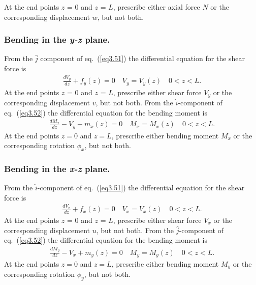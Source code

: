 \documentclass{AeroStructure-ERJohnson}
\begin{document}
\vspace*{-10pt}\pagebreak

\noindent At the end points $z$ = 0 and $z$ = $L$, prescribe either axial force $N$ or the corresponding displacement $w$, but not both.

\subsubsection{Bending in the \textit{y-z} plane.} From the $\hat{j}$ component of eq.~(\ref{eq3.51}) the differential equation for the shear force is
\begin{align}\label{eq3.54}
\frac{d V_{y}}{d z}+f_{y}(z)=0 \quad V_{y}=V_{y}(z) \quad 0<z<L.
\end{align}
At the end points $z$ = 0 and $z$ = $L$, prescribe either shear force $V_y$ or the corresponding displacement $v$, but not both. From the $\hat{i}$-component of eq.~(\ref{eq3.52}) the differential equation for the bending moment is
\begin{align}\label{eq3.55}
\frac{d M_{x}}{d z}-V_{y}+m_{x}(z)=0 \quad M_{x}=M_{x}(z) \quad 0<z<L.
\end{align}
At the end points $z = 0$ and $z=L$, prescribe either bending moment $M_{x}$ or the corresponding rotation $\phi_{x}$, but not both.

\subsubsection{Bending in the \textit{x-z} plane.} From the $\hat{i}$-component of eq.~(\ref{eq3.51}) the differential equation for the shear force is
\begin{align}\label{eq3.56}
\frac{d V_{x}}{d z}+f_{x}(z)=0 \quad V_{x}=V_{x}(z) \quad 0<z<L.
\end{align}
At the end points $z$ = 0 and $z$ = $L$, prescribe either shear force $V_x$ or the corresponding displacement $u$, but not both. From the $\hat{j}$-component of eq.~(\ref{eq3.52}) the differential equation for the bending moment is
\begin{align}\label{eq3.57}
\frac{d M_{y}}{d z}-V_{x}+m_{y}(z)=0 \quad M_{y}=M_{y}(z) \quad 0<z<L.
\end{align}
At the end points $z = 0$ and $z = L$, prescribe either bending moment $M_y$ or the corresponding rotation $\phi_{y}$, but not both.
\end{document}
